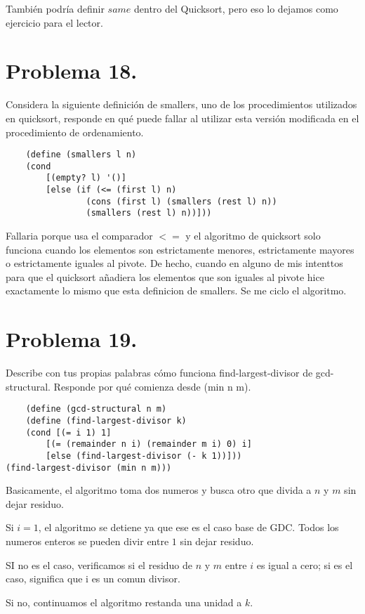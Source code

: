 \documentclass{article}
\begin{document}
También podría definir $same$ dentro del Quicksort, pero eso lo dejamos como ejercicio para el lector.

\section*{Problema 18.}
Considera la siguiente definición de smallers, uno de los procedimientos utilizados
en quicksort, responde en qué puede fallar al utilizar esta versión modificada en el procedimiento
de ordenamiento.

\begin{lstlisting}
    (define (smallers l n)
	(cond
		[(empty? l) '()]
		[else (if (<= (first l) n)
				(cons (first l) (smallers (rest l) n))
				(smallers (rest l) n))]))
\end{lstlisting}

Fallaria porque usa el comparador $<=$ y el algoritmo de quicksort solo funciona cuando los elementos son estrictamente menores, estrictamente mayores o estrictamente iguales al pivote. De hecho, cuando en alguno de mis intenttos para que el quicksort añadiera los elementos que son iguales al pivote hice exactamente lo mismo que esta definicion de smallers. Se me ciclo el algoritmo.

\section*{Problema 19.}
Describe con tus propias palabras cómo funciona find-largest-divisor de gcd-
structural. Responde por qué comienza desde (min n m).

\begin{lstlisting}
    (define (gcd-structural n m)
	(define (find-largest-divisor k)
	(cond [(= i 1) 1]
		[(= (remainder n i) (remainder m i) 0) i]
		[else (find-largest-divisor (- k 1))]))
(find-largest-divisor (min n m)))
\end{lstlisting}

Basicamente, el algoritmo toma dos numeros y busca otro que divida a $n$ y $m$ sin dejar residuo. 

Si $i = 1$, el algoritmo se detiene ya que ese es el caso base de GDC. Todos los numeros enteros se pueden divir entre $1$ sin dejar residuo.

SI no es el caso, verificamos si el residuo de $n$ y $m$ entre $i$ es igual a cero; si es el caso, significa que i es un comun divisor.

Si no, continuamos el algoritmo restanda una unidad a $k$.
\end{document}

